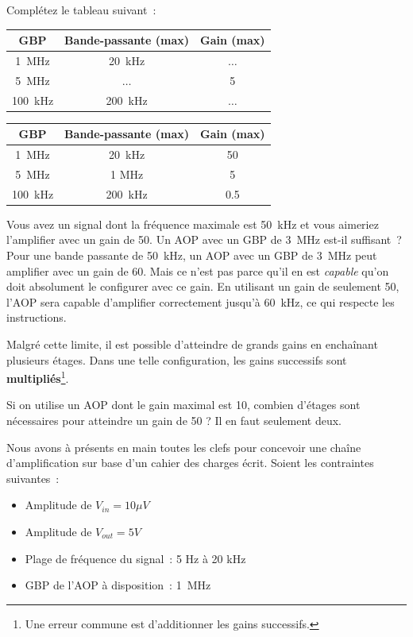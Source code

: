 {
Complétez le tableau suivant~:
\begin{center}
\renewcommand{\arraystretch}{1.5}
\begin{tabular}{ccc}
GBP & Bande-passante (max) & Gain (max) \\ \hline
1~MHz & 20~kHz & $\dots$ \\
5~MHz & $\dots$ & 5 \\
100~kHz & 200~kHz & $\dots$ \\
\end{tabular}
\end{center}
}
{
  \begin{center}
  \renewcommand{\arraystretch}{1.5}
  \begin{tabular}{ccc}
  GBP & Bande-passante (max) & Gain (max) \\ \hline
  1~MHz & 20~kHz & 50 \\
  5~MHz & 1 MHz & 5 \\
  100~kHz & 200~kHz & 0.5 \\
  \end{tabular}
  \end{center}
}

{
Vous avez un signal dont la fréquence maximale est 50~kHz et vous aimeriez l'amplifier avec un gain de 50.
Un AOP avec un GBP de 3~MHz est-il suffisant~?
}
{
  Pour une bande passante de 50~kHz, un AOP avec un GBP de 3~MHz peut amplifier avec un gain de 60.
  Mais ce n'est pas parce qu'il en est \textit{capable} qu'on doit absolument le configurer avec ce gain.
  En utilisant un gain de seulement 50, l'AOP sera capable d'amplifier correctement jusqu'à 60~kHz, ce qui respecte les instructions.
}

Malgré cette limite, il est possible d'atteindre de grands gains en enchaînant plusieurs étages.
Dans une telle configuration, les gains successifs sont \textbf{multipliés}\footnote{Une erreur commune est d'additionner les gains successifs.}.

{
Si on utilise un AOP dont le gain maximal est 10, combien d'étages sont nécessaires pour atteindre un gain de 50 ?
}
{
  Il en faut seulement deux.
}

Nous avons à présents en main toutes les clefs pour concevoir une chaîne d'amplification sur base d'un cahier des charges écrit.
Soient les contraintes suivantes~:

\begin{itemize}
  \item Amplitude de $V_{in} = 10 \mu V$
  \item Amplitude de $V_{out} = 5 V$
  \item Plage de fréquence du signal~: 5 Hz à 20 kHz
  \item GBP de l'AOP à disposition~: 1~MHz
\end{itemize}

